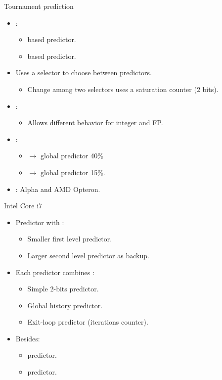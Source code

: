 \begin{frame}[t]{Tournament prediction}
\begin{itemize}
  \item {}:
    \begin{itemize}
      \item {} based predictor.
      \item {} based predictor.
    \end{itemize}
  \item Uses a selector to choose between predictors.
    \begin{itemize}
      \item Change among two selectors uses a saturation counter (2 bits).
    \end{itemize}
  \item {}:
    \begin{itemize}
      \item Allows different behavior for integer and FP.
    \end{itemize}
  \item {}:
    \begin{itemize}
      \item {} $\rightarrow$ global predictor 40\%
      \item {} $\rightarrow$ global predictor 15\%.
    \end{itemize}
  \item {}: Alpha and AMD Opteron.
\end{itemize}
\end{frame}


\begin{frame}[t]{Intel Core i7}
\begin{itemize}
  \item Predictor with :
    \begin{itemize}
      \item Smaller first level predictor.
      \item Larger second level predictor as backup.
    \end{itemize}

  \item Each predictor combines :
    \begin{itemize}
      \item Simple 2-bits predictor.
      \item Global history predictor.
      \item Exit-loop predictor (iterations counter).
    \end{itemize}

  \item Besides:
    \begin{itemize}
      \item {} predictor.
      \item {} predictor.
    \end{itemize}
\end{itemize}
\end{frame}

